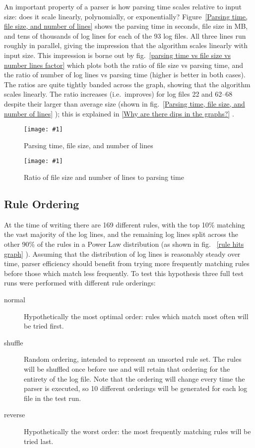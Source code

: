 \documentclass[draft]{svmult}
\newcommand{\showgraph}[3]{%
    \begin{figure}[hbt!]%
        \caption{#2}\label{#3}%
        \texttt{[image: \#1]}%
    \end{figure}%
}
\newcommand{\refwithpage}[1]{%
    \empty{}\vref{#1}%
}
\newcommand{\sectionref}[1]{%
    \textsection{}\vref*{#1}%
}
\newcommand{\refwithlabel}[2]{%
    #1~\vref{#2}%
}
\newcommand{\graphref}[1]{%
    \refwithlabel{fig.}{#1}%
}
\newcommand{\Graphref}[1]{%
    \refwithlabel{Figure}{#1}%
}
\newcommand{\numberOFlogFILES}[0]{%
    93%
}
\newcommand{\numberOFrules}[0]{%
    169%
}
\begin{document}
An important property of a parser is how parsing time scales relative to
input size: does it scale linearly, polynomially, or exponentially?
\Graphref{Parsing time, file size, and number of lines} shows the parsing
time in seconds, file size in MB, and tens of thousands of log lines for
each of the \numberOFlogFILES{} log files.  All three lines run roughly in
parallel, giving the impression that the algorithm scales linearly with
input size.  This impression is borne out by \graphref{parsing time vs file
size vs number lines factor} which plots both the ratio of file size vs
parsing time, and the ratio of number of log lines vs parsing time (higher
is better in both cases).  The ratios are quite tightly banded across the
graph, showing that the algorithm scales linearly.  The ratio increases
(i.e.\ improves) for log files 22 and 62--68 despite their larger than
average size (shown in \graphref{Parsing time, file size, and number of
lines}); this is explained in \sectionref{Why are there dips in the
graphs?}.  \showgraph{build/plot-normal-filesize-numlines}{Parsing time,
file size, and number of lines}{Parsing time, file size, and number of
lines} \showgraph{build/plot-normal-filesize-numlines-factor}{Ratio of file
size and number of lines to parsing time}{parsing time vs file size vs
number lines factor}

\newpage
\subsection{Rule Ordering}

\label{Rule ordering}
\label{rule ordering for efficiency}
\label{rule efficiency}

At the time of writing there are \numberOFrules{} different rules, with the
top 10\% matching the vast majority of the log lines, and the remaining log
lines split across the other 90\% of the rules in a Power Law distribution
(as shown in fig.~\refwithpage{rule hits graph}).
Assuming that
the distribution of log lines is reasonably steady over time, parser
efficiency should benefit from trying more frequently matching rules before
those which match less frequently.  To test this hypothesis three full test
runs were performed with different rule orderings:

\begin{description}

    \item [normal]  Hypothetically the most optimal order: rules which
        match most often will be tried first.

    \item [shuffle] Random ordering, intended to represent an unsorted rule
        set.  The rules will be shuffled once before use and will retain
        that ordering for the entirety of the log file.  Note that the
        ordering will change every time the parser is executed, so 10
        different orderings will be generated for each log file in the test
        run.

    \item [reverse] Hypothetically the worst order: the most frequently
        matching rules will be tried last.

\end{description}
\end{document}
